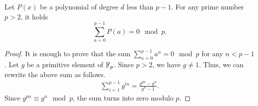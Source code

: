   \begin{lemma}\label{lem:sum_poly}
    Let $P(x)$ be a polynomial of degree $d$ less than $p-1$.
    For any prime number $p > 2$, it holds
    \[
      \sum_{a=0}^{p-1} P(a) = 0 \mod p.
    \]
  \end{lemma}
  \begin{proof}
    It is enough to prove that the sum $\sum_{a=0}^{p-1} a^n = 0 \mod p$ for any $n < p-1$.
    Let $g$ be a primitive element of $\mathbb{F}_p$.
    Since $p > 2$, we have $g \ne 1$.
    Thus, we can rewrite the above sum as follows.
    \begin{align}
      \sum_{i=1}^{p-1} g^{in} = \frac{g^{pn} - g^n}{g^n - 1}.
    \end{align}
    Since $g^{pn} \equiv g^n \mod p$, the sum turns into zero modulo $p$.
  \end{proof}

